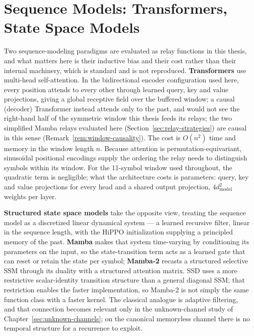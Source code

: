 \section{Sequence Models: Transformers, State Space Models}\label{sec:sequence-models-transformers-and-state-space-models}

Two sequence-modeling paradigms are evaluated as relay functions in this thesis, and what matters here is
their inductive bias and their cost rather than their internal machinery, which is standard and is not
reproduced. \textbf{Transformers} \cite{Vaswani2017Attention} use multi-head self-attention. In the bidirectional encoder configuration used here, every position
attends to every other through learned query, key and value projections, giving a global receptive field over the buffered window; a causal (decoder) Transformer instead attends only to the past, and would not see the right-hand half of the symmetric window this thesis feeds its relays; the two simplified Mamba relays evaluated here (Section~\ref{sec:relay-strategies}) are causal in this sense (Remark~\ref{rem:window-causality}). The cost is
$O(n^2)$ time and memory in the window length $n$. Because attention is permutation-equivariant, sinusoidal
positional encodings supply the ordering the relay needs to distinguish symbols within its window. For the
11-symbol window used throughout, the quadratic term is negligible; what the architecture costs is
parameters: query, key and value projections for every head and a shared output projection, \(4d_{\text{model}}^{2}\) weights per layer.

\textbf{Structured state space models} \cite{GuGoelRe2022SSM} take the opposite view, treating the sequence
model as a discretized linear dynamical system --- a learned recursive filter, linear in the sequence length,
with the HiPPO initialization supplying a principled memory of the past. \textbf{Mamba} \cite{gu2023mamba}
makes that system time-varying by conditioning its parameters on the input, so the state-transition term acts
as a learned gate that can reset or retain the state per symbol; \textbf{Mamba-2} \cite{DaoGu2024TransformersSSM}
recasts a structured selective SSM through its duality with a structured attention matrix. SSD uses a more
restrictive scalar-identity transition structure than a general diagonal SSM; that restriction enables the
faster implementation, so Mamba-2 is not simply the same function class with a faster kernel. The classical analogue is adaptive filtering, and that
connection becomes relevant only in the unknown-channel study of Chapter~\ref{sec:unknown-channels}; on the
canonical memoryless channel there is no temporal structure for a recurrence to exploit.

